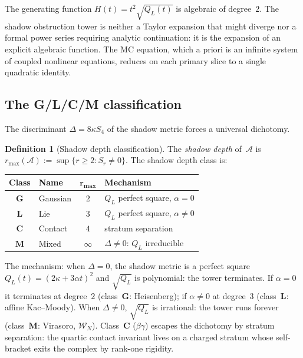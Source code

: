 \documentclass[11pt,reqno]{amsart}
\theoremstyle{definition}
\newtheorem{definition}[theorem]{Definition}
\theoremstyle{remark}
\newcommand{\cA}{\mathcal{A}}
\newcommand{\cW}{\mathcal{W}}
\numberwithin{equation}{section}
\begin{document}
The generating function $H(t) = t^2\sqrt{Q_L(t)}$ is
algebraic of degree~$2$. The shadow obstruction tower
is neither a Taylor expansion that might diverge nor a
formal power series requiring analytic continuation: it is
the expansion of an explicit algebraic function. The
MC equation, which a priori is an infinite system of coupled
nonlinear equations, reduces on each primary slice to a
single quadratic identity.

\subsection{The G/L/C/M classification}
\label{ssec:glcm}

The discriminant $\Delta = 8\kappa S_4$ of the shadow
metric forces a universal dichotomy.

\begin{definition}[Shadow depth classification]
\label{def:shadow-depth}
The \emph{shadow depth} of~$\cA$ is
$r_{\max}(\cA) := \sup\{r \ge 2 : S_r \ne 0\}$.
The shadow depth class is:
\begin{center}
\renewcommand{\arraystretch}{1.2}
\begin{tabular}{clcl}
\toprule
\textbf{Class} & \textbf{Name} &
 $\boldsymbol{r_{\max}}$ & \textbf{Mechanism} \\
\midrule
$\mathbf{G}$ & Gaussian &
 $2$ & $Q_L$ perfect square, $\alpha = 0$ \\
$\mathbf{L}$ & Lie &
 $3$ & $Q_L$ perfect square, $\alpha \ne 0$ \\
$\mathbf{C}$ & Contact &
 $4$ & stratum separation \\
$\mathbf{M}$ & Mixed &
 $\infty$ & $\Delta \ne 0$: $Q_L$ irreducible \\
\bottomrule
\end{tabular}
\end{center}
\end{definition}

The mechanism: when $\Delta = 0$, the shadow metric is a
perfect square $Q_L(t) = (2\kappa + 3\alpha t)^2$ and
$\sqrt{Q_L}$ is polynomial: the tower terminates.
If $\alpha = 0$ it terminates at degree~$2$ (class~$\mathbf{G}$:
Heisenberg); if $\alpha \ne 0$ at degree~$3$
(class~$\mathbf{L}$: affine Kac--Moody). When
$\Delta \ne 0$, $\sqrt{Q_L}$ is irrational: the tower
runs forever (class~$\mathbf{M}$: Virasoro,
$\cW_N$). Class~$\mathbf{C}$ ($\beta\gamma$)
escapes the dichotomy by stratum separation: the quartic
contact invariant lives on a charged stratum whose
self-bracket exits the complex by rank-one rigidity.
\end{document}
